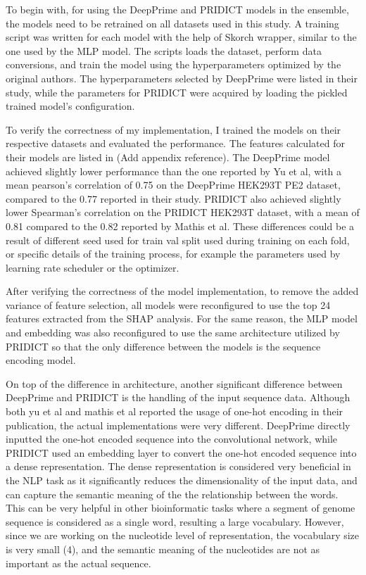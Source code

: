 To begin with, for using the DeepPrime and PRIDICT models in the ensemble, the models need to be retrained on all datasets used in this study. A training script was written for each model with the help of Skorch wrapper, similar to the one used by the MLP model. The scripts loads the dataset, perform data conversions, and train the model using the hyperparameters optimized by the original authors. The hyperparameters selected by DeepPrime were listed in their study, while the parameters for PRIDICT were acquired by loading the pickled trained model's configuration. 

To verify the correctness of my implementation, I trained the models on their respective datasets and evaluated the performance. The features calculated for their models are listed in (Add appendix reference). The DeepPrime model achieved slightly lower performance than the one reported by Yu et al, with a mean pearson's correlation of 0.75 on the DeepPrime HEK293T PE2 dataset, compared to the 0.77 reported in their study. PRIDICT also achieved slightly lower Spearman's correlation on the PRIDICT HEK293T dataset, with a mean of 0.81 compared to the 0.82 reported by Mathis et al. These differences could be a result of different seed used for train val split used during training on each fold, or specific details of the training process, for example the parameters used by learning rate scheduler or the optimizer. 

After verifying the correctness of the model implementation, to remove the added variance of feature selection, all models were reconfigured to use the top 24 features extracted from the SHAP analysis. For the same reason, the MLP model and embedding was also reconfigured to use the same architecture utilized by PRIDICT so that the only difference between the models is the sequence encoding model. 

On top of the difference in architecture, another significant difference between DeepPrime and PRIDICT is the handling of the input sequence data. Although both yu et al and mathis et al reported the usage of one-hot encoding in their publication, the actual implementations were very different. DeepPrime directly inputted the one-hot encoded sequence into the convolutional network, while PRIDICT used an embedding layer to convert the one-hot encoded sequence into a dense representation. The dense representation is considered very beneficial in the NLP task as it significantly reduces the dimensionality of the input data, and can capture the semantic meaning of the the relationship between the words\cite{goldbergPrimerNeuralNetwork2015}. This can be very helpful in other bioinformatic tasks where a segment of genome sequence is considered as a single word, resulting a large vocabulary\cite{cegliaIdentificationTranscriptionalPrograms2023}. However, since we are working on the nucleotide level of representation, the vocabulary size is very small (4), and the semantic meaning of the nucleotides are not as important as the actual sequence. 

